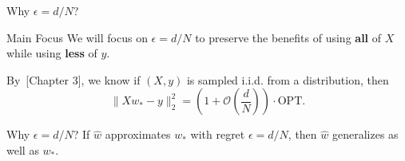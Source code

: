 \documentclass{beamer}
\newcommand{\R}{\mathbb{R}}
\newcommand{\what}{\hat w}
\newcommand{\wopt}{w_*}
\begin{document}
\begin{frame}{Why $\epsilon = d/N$?}

    
    \begin{block}{Main Focus}
        We will focus on $\epsilon = d/N$ to preserve the benefits of using \textbf{all} of $X$ while using \textbf{less} of $y$.
    \end{block}

    By~\citep{Mostafa2012}[Chapter 3], we know if $(X, y)$ is sampled i.i.d. from a distribution, then
    $$
        \|Xw_* - y \|_2^2 = \left( 1 + \mathcal{O}\left( \frac{d}{N} \right) \right) \cdot \mathrm{OPT}.
    $$

    \begin{block}{Why $\epsilon = d/N$?}
        If $\what$ approximates $\wopt$ with regret $\epsilon = d/N$, then $\what$ generalizes as well as $\wopt$.
    \end{block}
\end{frame}



\end{document}
